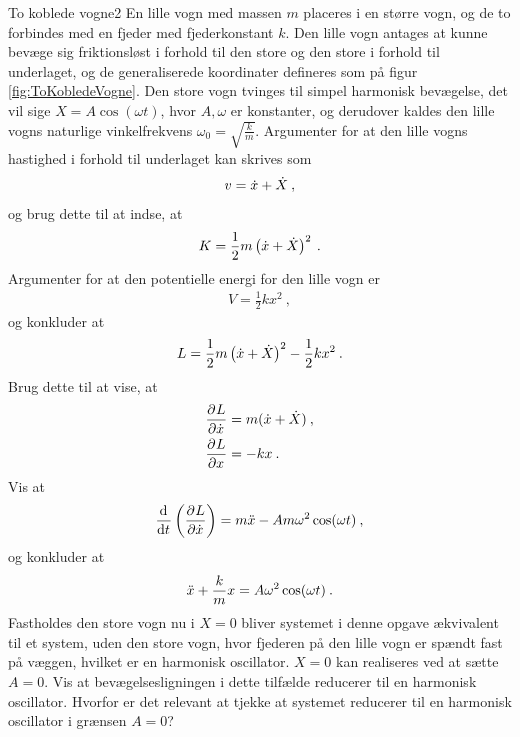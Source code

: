 \begin{opgave}{To koblede vogne}{2} \label{opg:ToKobledeVogne}
En lille vogn med massen $m$ placeres i en større vogn, og de to forbindes med en fjeder med fjederkonstant $k$. Den lille vogn antages at kunne bevæge sig friktionsløst i forhold til den store og den store i forhold til underlaget, og de generaliserede koordinater defineres som på figur \ref{fig:ToKobledeVogne}. Den store vogn tvinges til simpel harmonisk bevægelse, det vil sige $X = A\cos(\omega t)$, hvor $A,\omega$ er konstanter, og derudover kaldes den lille vogns naturlige vinkelfrekvens $\omega_0 = \sqrt{\frac{k}{m}}$.
\opg Argumenter for at den lille vogns hastighed i forhold til underlaget kan skrives som
\begin{align*}
v = \dt{x} + \dt{X} \: ,
\end{align*}
og brug dette til at indse, at
\begin{align*}
K = \frac{1}{2}m\left(\dt{x} + \dt{X}\right)^2 \: .
\end{align*}
\opg Argumenter for at den potentielle energi for den lille vogn er
\begin{align*}
V = \frac{1}{2}kx^2 \: ,
\end{align*}
og konkluder at
\begin{align*}
L = \frac{1}{2}m\left(\dt{x} + \dt{X}\right)^2 - \frac{1}{2}kx^2 \: .
\end{align*}
\opg Brug dette til at vise, at
\begin{align*}
\pdif{\dt{x}}{L} &= m(\dt{x} + \dt{X}) \: ,\\
\pdif{x}{L} &= -kx \: .
\end{align*}
\opg Vis at
\begin{align*}
\dif{t}{}\left(\pdif{\dt{x}}{L}\right) = m\ddt{x} - Am\omega^2\cos(\omega t) \: ,
\end{align*}
og konkluder at
\begin{align*}
\ddt{x} + \frac{k}{m}x = A\omega^2\cos(\omega t) \: .
\end{align*}
\opg Fastholdes den store vogn nu i $X=0$ bliver systemet i denne opgave ækvivalent til et system, uden den store vogn, hvor fjederen på den lille vogn er spændt fast på væggen, hvilket er en harmonisk oscillator. $X=0$ kan realiseres ved at sætte $A=0$. Vis at bevægelsesligningen i dette tilfælde reducerer til en harmonisk oscillator.
\opg Hvorfor er det relevant at tjekke at systemet reducerer til en harmonisk oscillator i grænsen $A=0$?\\ \\
\end{opgave}
